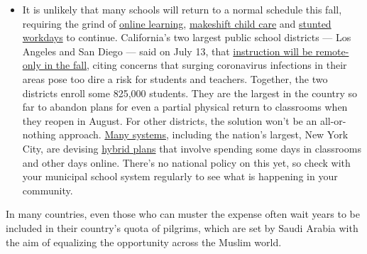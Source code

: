 \begin{itemize}
  \begin{itemize}
  \tightlist
  \item
    It is unlikely that many schools will return to a normal schedule
    this fall, requiring the grind of
    \href{https://www.nytimes3xbfgragh.onion/2020/06/05/us/coronavirus-education-lost-learning.html?action=click\&pgtype=Article\&state=default\&region=MAIN_CONTENT_3\&context=storylines_faq}{online
    learning},
    \href{https://www.nytimes3xbfgragh.onion/2020/05/29/us/coronavirus-child-care-centers.html?action=click\&pgtype=Article\&state=default\&region=MAIN_CONTENT_3\&context=storylines_faq}{makeshift
    child care} and
    \href{https://www.nytimes3xbfgragh.onion/2020/06/03/business/economy/coronavirus-working-women.html?action=click\&pgtype=Article\&state=default\&region=MAIN_CONTENT_3\&context=storylines_faq}{stunted
    workdays} to continue. California's two largest public school
    districts --- Los Angeles and San Diego --- said on July 13, that
    \href{https://www.nytimes3xbfgragh.onion/2020/07/13/us/lausd-san-diego-school-reopening.html?action=click\&pgtype=Article\&state=default\&region=MAIN_CONTENT_3\&context=storylines_faq}{instruction
    will be remote-only in the fall}, citing concerns that surging
    coronavirus infections in their areas pose too dire a risk for
    students and teachers. Together, the two districts enroll some
    825,000 students. They are the largest in the country so far to
    abandon plans for even a partial physical return to classrooms when
    they reopen in August. For other districts, the solution won't be an
    all-or-nothing approach.
    \href{https://bioethics.jhu.edu/research-and-outreach/projects/eschool-initiative/school-policy-tracker/}{Many
    systems}, including the nation's largest, New York City, are
    devising
    \href{https://www.nytimes3xbfgragh.onion/2020/06/26/us/coronavirus-schools-reopen-fall.html?action=click\&pgtype=Article\&state=default\&region=MAIN_CONTENT_3\&context=storylines_faq}{hybrid
    plans} that involve spending some days in classrooms and other days
    online. There's no national policy on this yet, so check with your
    municipal school system regularly to see what is happening in your
    community.
  \end{itemize}
\end{itemize}

In many countries, even those who can muster the expense often wait
years to be included in their country's quota of pilgrims, which are set
by Saudi Arabia with the aim of equalizing the opportunity across the
Muslim world.

